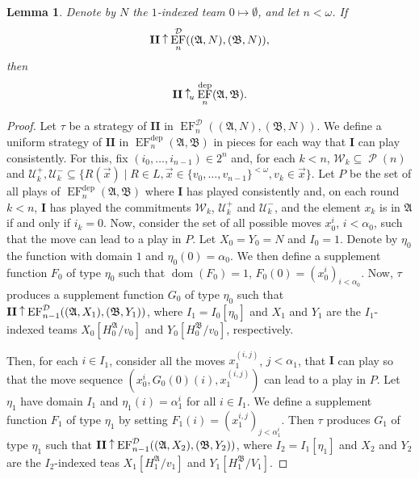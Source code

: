 \documentclass[10pt,a4paper]{amsart}
\newtheorem{lemma}[definition]{Lemma}
\newcommand{\wins}{\mathbin{\raisebox{0.8\depth}{$\uparrow$}}}
\newcommand{\playerone}{\mathrm{\mathbf{I}}}
\newcommand{\playertwo}{\mathrm{\mathbf{II}}}
\DeclareMathOperator{\EF}{EF}
\newcommand{\EFdep}{\EF^{\mathrm{dep}}}
\newcommand{\winsu}{\wins_{\!\textrm u}}
\newcommand{\W}{\mathcal W}
\newcommand{\U}{\mathcal U}
\newcommand{\A}{\mathfrak{A}}
\newcommand{\B}{\mathfrak{B}}
\newcommand{\deplog}{\mathcal D}
\DeclareMathOperator{\Pow}{\mathcal{P}}
\DeclareMathOperator{\dom}{dom}
\begin{document}
\begin{lemma}\label{lemma: from auxiliary game to uniform game}
    Denote by $N$ the $1$-indexed team $0\mapsto\emptyset$, and let $n<\omega$. If
    \[
        \playertwo\wins\EF_n^\deplog((\A,N),(\B,N)),
    \]
    then
    \[
        \playertwo\winsu\EFdep_n(\A,\B).
    \]
\end{lemma}
\begin{proof}
    Let $\tau$ be a strategy of $\playertwo$ in $\EF_n^\deplog((\A,N),(\B,N))$. We define a uniform strategy of $\playertwo$ in $\EFdep_n(\A,\B)$ in pieces for each way that $\playerone$ can play consistently. For this, fix $(i_0,\dots,i_{n-1})\in 2^n$ and, for each $k<n$, $\W_k\subseteq\Pow(n)$ and $\U^+_k,\U^-_k\subseteq\{ R(\vec x) \mid R\in L, \vec x\in\{v_0,\dots,v_{n-1}\}^{<\omega}, v_k\in\vec x\}$. Let $P$ be the set of all plays of $\EFdep_n(\A,\B)$ where $\playerone$ has played consistently and, on each round $k<n$, $\playerone$ has played the commitments $\W_k$, $\U^+_k$ and $\U^-_k$, and the element $x_k$ is in $\A$ if and only if $i_k = 0$. Now, consider the set of all possible moves $x_0^i$, $i<\alpha_0$, such that the move can lead to a play in $P$. Let $X_0 = Y_0 = N$ and $I_0 = 1$. Denote by $\eta_0$ the function with domain $1$ and $\eta_0(0) = \alpha_0$. We then define a supplement function $F_0$ of type $\eta_0$ such that $\dom(F_0) = 1$, $F_0(0) = (x_0^i)_{i<\alpha_0}$. Now, $\tau$ produces a supplement function $G_0$ of type $\eta_0$ such that $\playertwo\wins\EF_{n-1}^\deplog((\A,X_1),(\B,Y_1))$, where $I_1 = I_0[\eta_0]$ and $X_1$ and $Y_1$ are the $I_1$-indexed teams $X_0[H_0^\A/v_0]$ and $Y_0[H_0^\B/v_0]$, respectively.

    Then, for each $i\in I_1$, consider all the moves $x_1^{(i,j)}$, $j<\alpha_1$, that $\playerone$ can play so that the move sequence $(x_0^i,G_0(0)(i),x_1^{(i,j)})$ can lead to a play in $P$. Let $\eta_1$ have domain $I_1$ and $\eta_1(i) = \alpha^i_1$ for all $i\in I_1$. We define a supplement function $F_1$ of type $\eta_1$ by setting $F_1(i) = (x_1^{i,j})_{j<\alpha_1^i}$. Then $\tau$ produces $G_1$ of type $\eta_1$ such that $\playertwo\wins\EF^\deplog_{n-1}((\A,X_2),(\B,Y_2))$, where $I_2 = I_1[\eta_1]$ and $X_2$ and $Y_2$ are the $I_2$-indexed teas $X_1[H_1^\A/v_1]$ and $Y_1[H_1^\B/V_1]$.


\end{proof}
\end{document}
